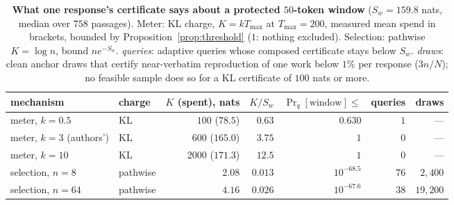 \begin{table}[t]
\centering\footnotesize
\caption{\textbf{What one response's certificate says about a protected $50$-token window}
($S_w = 159.8$ nats, median over $758$ passages). Meter: KL charge, $K = kT_{\max}$ at $T_{\max} = 200$,
measured mean spend in brackets, bounded by Proposition~\ref{prop:threshold} ($1$: nothing excluded).
Selection: pathwise $K = \log n$, bound $n e^{-S_w}$. \emph{queries}: adaptive queries whose composed
certificate stays below $S_w$. \emph{draws}: clean anchor draws that certify near-verbatim reproduction
of one work below $1\%$ per response ($3n/N$); no feasible sample does so for a KL certificate of $100$ nats or more.}
\label{tab:certificate}
\setlength{\tabcolsep}{4.5pt}
\begin{tabular}{@{}llrrrrr@{}}
\toprule
mechanism & charge & $K$ (spent), nats & $K/S_w$ & $\Pr_q[\text{window}] \le$ & queries & draws \\
\midrule
meter, $k=0.5$ & KL & $100$ ($78.5$) & $0.63$ & $0.630$ & $1$ & --- \\
meter, $k=3$ (authors') & KL & $600$ ($165.0$) & $3.75$ & $1$ & $0$ & --- \\
meter, $k=10$ & KL & $2000$ ($171.3$) & $12.5$ & $1$ & $0$ & --- \\
\midrule
selection, $n=8$ & pathwise & $2.08$ & $0.013$ & $10^{-68.5}$ & $76$ & $2{,}400$ \\
selection, $n=64$ & pathwise & $4.16$ & $0.026$ & $10^{-67.6}$ & $38$ & $19{,}200$ \\
\bottomrule
\end{tabular}
\end{table}

